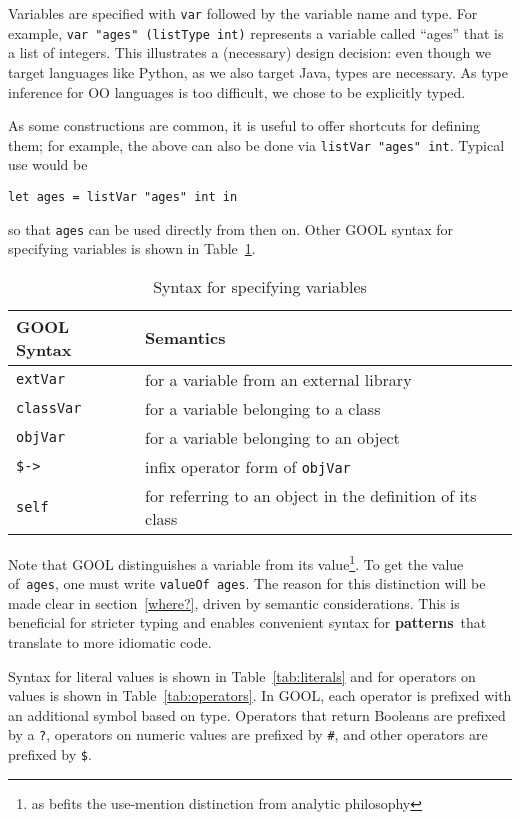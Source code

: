 \documentclass[sigplan,review,anonymous,prologue,dvipsnames]{acmart}
\newcommand{\abbrev}[1]{\textbf{#1}}
\newcommand{\oopatterns}{\abbrev{patterns}}
\begin{document}
Variables are specified with \verb|var| followed by the variable name and type.
For example, \verb|var "ages" (listType int)| represents a variable called
``ages'' that is a list of integers. This illustrates a (necessary) design
decision: even though we target languages like Python, as we also target
Java, types are necessary. As type inference for OO languages is too
difficult, we chose to be explicitly typed.

As some constructions are common, it is useful to offer shortcuts for
defining them; for example, the above can also be done via
\verb|listVar "ages" int|. Typical use would be
\begin{lstlisting}
let ages = listVar "ages" int in
\end{lstlisting}
so that \verb|ages| can be used directly from then on. Other GOOL syntax for
specifying variables is shown in Table~\ref{tab:variables}.

\begin{table}[!h]
\caption{Syntax for specifying variables}
\begin{tabular}{p{} p{}}
  \textbf{GOOL Syntax} & \textbf{Semantics} \\
  \midrule
  \verb|extVar| & for a variable from an external library \\
  \verb|classVar| & for a variable belonging to a class \\
  \verb|objVar| & for a variable belonging to an object \\
  \verb|$->| & infix operator form of \verb|objVar| \\
  \verb|self| & for referring to an object in the definition of its class \\
\end{tabular}
\label{tab:variables}
\end{table}

Note that GOOL distinguishes a variable from its value\footnote{
as befits the use-mention distinction from analytic philosophy}. To get
the value of~\verb|ages|, one must write \verb|valueOf ages|. The reason for
this distinction will be made clear in section~\ref{where?}, driven
by semantic considerations. This is beneficial for stricter typing and
enables convenient syntax for \oopatterns~that translate to more idiomatic
code.

Syntax for literal values is shown in Table~\ref{tab:literals} and for
operators on values is shown in Table~\ref{tab:operators}. In GOOL, each
operator is prefixed with an additional symbol based on type. Operators that
return Booleans are prefixed by a \verb|?|, operators on numeric values are
prefixed by \verb|#|, and other operators are prefixed by \verb|$|.
\end{document}
